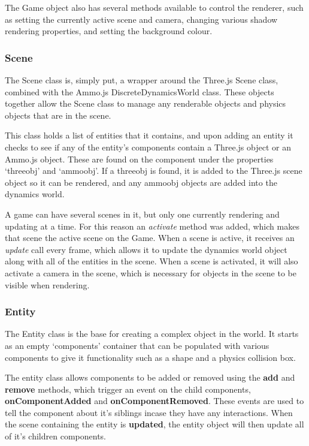 	The Game object also has several methods available to control the renderer, such as setting the currently active scene and camera, changing various shadow rendering properties, and setting the background colour.

	\subsubsection{Scene}
	The Scene class is, simply put, a wrapper around the Three.js Scene class, combined with the Ammo.js DiscreteDynamicsWorld class. These objects together allow the Scene class to manage any renderable objects and physics objects that are in the scene.

	This class holds a list of entities that it contains, and upon adding an entity it checks to see if any of the entity's components contain a Three.js object or an Ammo.js object. These are found on the component under the properties `threeobj' and `ammoobj'. If a threeobj is found, it is added to the Three.js scene object so it can be rendered, and any ammoobj objects are added into the dynamics world.

	A game can have several scenes in it, but only one currently rendering and updating at a time. For this reason an \emph{activate} method was added, which makes that scene the active scene on the Game. When a scene is active, it receives an \emph{update} call every frame, which allows it to update the dynamics world object along with all of the entities in the scene. When a scene is activated, it will also activate a camera in the scene, which is necessary for objects in the scene to be visible when rendering.

	\subsubsection{Entity}
	The Entity class is the base for creating a complex object in the world. It starts as an empty `components' container that can be populated with various components to give it functionality such as a shape and a physics collision box. 

	The entity class allows components to be added or removed using the \textbf{add} and \textbf{remove} methods, which trigger an event on the child components, \textbf{onComponentAdded} and \textbf{onComponentRemoved}. These events are used to tell the component about it's siblings incase they have any interactions. When the scene containing the entity is \textbf{updated}, the entity object will then update all of it's children components.

